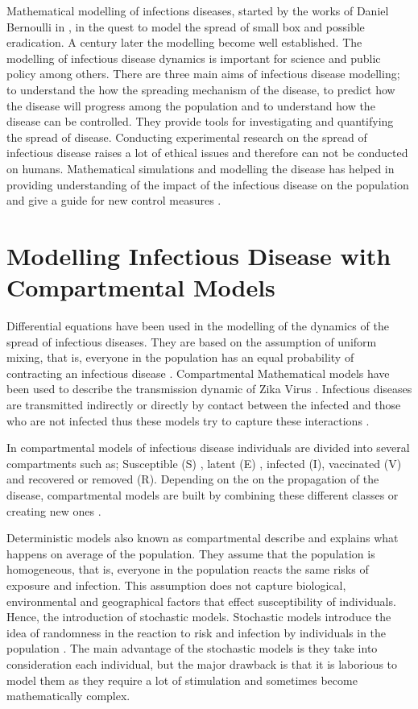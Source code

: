 Mathematical modelling of infections diseases, started by the works of Daniel Bernoulli in \cite{bernoulli1760essai}, in the quest to model the spread of small box and possible eradication. A century later the modelling become well established. The modelling of infectious disease dynamics is important for science and public policy among others. There are three main aims of infectious disease modelling; to understand the how the spreading mechanism of the disease, to  predict how the disease will progress among the population and to understand how the disease can be controlled. They provide tools for investigating and quantifying the spread of disease. Conducting experimental research on the spread of infectious disease raises a lot of ethical issues and therefore can not be conducted on humans. Mathematical simulations and modelling the disease has helped in providing understanding of the impact of the infectious disease on the population and give a guide for new control measures \citep{ming2016stochastic}.


\section{Modelling Infectious Disease with Compartmental Models}

Differential equations have been used in the modelling of the dynamics of the spread of infectious diseases. They are based on the assumption of uniform mixing, that is, everyone in the population has an equal probability of contracting an infectious disease \citep{kaplan2002emergency}.
Compartmental Mathematical models have been used to describe the transmission dynamic of Zika Virus \citep{gao2016}. Infectious diseases are transmitted indirectly  or directly by contact between the infected and those who are not infected thus these models try to capture these interactions \citep{sat}. 
 
In compartmental models of infectious disease individuals are divided into  several compartments such as; Susceptible (S) , latent (E) , infected (I), vaccinated (V) and recovered or removed (R). Depending on the on the propagation of the disease, compartmental models are built by combining these different classes or creating new ones \citep{li}.

 
Deterministic models also known as compartmental describe and explains what happens on average of the population. They assume that the population is homogeneous, that is, everyone in the population reacts the same risks of exposure and infection. This assumption does not capture biological, environmental and geographical  factors that effect susceptibility of individuals. Hence, the introduction of stochastic models. Stochastic models introduce the idea of randomness in the reaction to risk and infection by individuals in the population \citep{ming2016stochastic}. The main advantage of the stochastic models is they take into consideration each individual, but the major drawback is that it is laborious to model them as they require a lot of stimulation and sometimes become mathematically complex.
 
